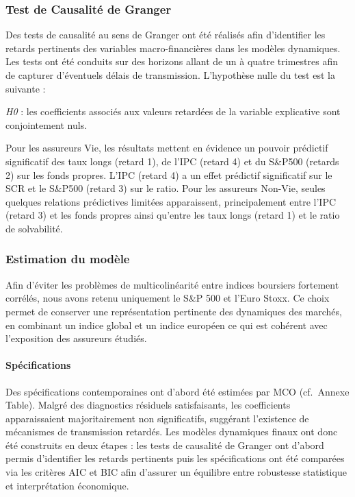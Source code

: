 \documentclass[
]{article}
\begin{document}
\subsubsection{Test de Causalité de
Granger}\label{test-de-causalituxe9-de-granger}

Des tests de causalité au sens de Granger ont été réalisés afin
d'identifier les retards pertinents des variables macro-financières dans
les modèles dynamiques. Les tests ont été conduits sur des horizons
allant de un à quatre trimestres afin de capturer d'éventuels délais de
transmission. L'hypothèse nulle du test est la suivante :

\emph{H0} : les coefficients associés aux valeurs retardées de la
variable explicative sont conjointement nuls.

Pour les assureurs Vie, les résultats mettent en évidence un pouvoir
prédictif significatif des taux longs (retard 1), de l'IPC (retard 4) et
du S\&P500 (retards 2) sur les fonds propres. L'IPC (retard 4) a un
effet prédictif significatif sur le SCR et le S\&P500 (retard 3) sur le
ratio. Pour les assureurs Non-Vie, seules quelques relations prédictives
limitées apparaissent, principalement entre l'IPC (retard 3) et les
fonds propres ainsi qu'entre les taux longs (retard 1) et le ratio de
solvabilité.

\subsubsection{Estimation du modèle}\label{estimation-du-moduxe8le}

Afin d'éviter les problèmes de multicolinéarité entre indices boursiers
fortement corrélés, nous avons retenu uniquement le S\&P 500 et l'Euro
Stoxx. Ce choix permet de conserver une représentation pertinente des
dynamiques des marchés, en combinant un indice global et un indice
européen ce qui est cohérent avec l'exposition des assureurs étudiés.

\paragraph{Spécifications}\label{spuxe9cifications}

Des spécifications contemporaines ont d'abord été estimées par MCO
(cf.~Annexe Table). Malgré des diagnostics résiduels satisfaisants, les
coefficients apparaissaient majoritairement non significatifs, suggérant
l'existence de mécanismes de transmission retardés. Les modèles
dynamiques finaux ont donc été construits en deux étapes : les tests de
causalité de Granger ont d'abord permis d'identifier les retards
pertinents puis les spécifications ont été comparées via les critères
AIC et BIC afin d'assurer un équilibre entre robustesse statistique et
interprétation économique.
\end{document}

